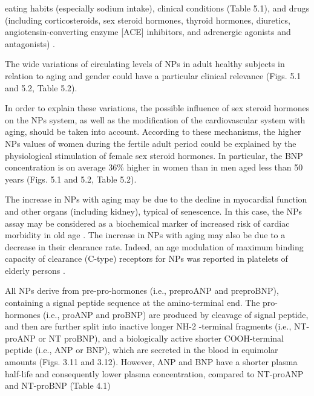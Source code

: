 \documentclass[14pt,a4paper,onecolumn]{extarticle}
\begin{document}
eating habits (especially sodium intake), clinical conditions (Table 5.1), and drugs (including corticosteroids, sex steroid hormones, thyroid hormones, diuretics, angiotensin-converting enzyme [ACE] inhibitors, and adrenergic agonists and antagonists) \citep{bib31} \citep{bib32} \citep{bib33} \citep{bib34} \citep{bib35} \citep{bib36}.



The wide variations of circulating levels of NPs in adult healthy subjects in relation to aging and gender could have a particular clinical relevance (Figs. 5.1 and 5.2, Table 5.2).

In order to explain these variations, the possible influence of sex steroid hormones on the NPs system, as well as the modification of the cardiovascular system with aging, should be taken into account. According to these mechanisms, the higher NPs values of women during the fertile adult period could be explained by the physiological stimulation of female sex steroid hormones. In particular, the BNP concentration is on average 36\% higher in women than in men aged less than 50 years \citep{bib37} (Figs. 5.1 and 5.2, Table 5.2).



 The increase in NPs with aging may be due to the decline in myocardial function and other organs (including kidney), typical of senescence. In this case, the NPs assay may be considered as a biochemical marker of increased risk of cardiac morbidity in old age \citep{bib316}.  The increase in NPs with aging may also be due to a decrease in their clearance rate. Indeed, an age modulation of maximum binding capacity of clearance (C-type) receptors for NPs was reported in platelets of elderly persons \citep{bib317}.



All NPs derive from pre-pro-hormones (i.e., preproANP and preproBNP), containing a signal peptide sequence at the amino-terminal end. The pro-hormones (i.e., proANP and proBNP) are produced by cleavage of signal peptide, and then are further split into inactive longer NH-2 -terminal fragments (i.e., NT-proANP or NT proBNP), and a biologically active shorter COOH-terminal peptide (i.e., ANP or BNP), which are secreted in the blood in equimolar amounts (Figs. 3.11 and 3.12). However, ANP and BNP have a shorter plasma half-life and consequently lower plasma concentration, compared to NT-proANP and NT-proBNP (Table 4.1) \citep{bib35} \citep{bib36} \citep{bib37}
\end{document}
